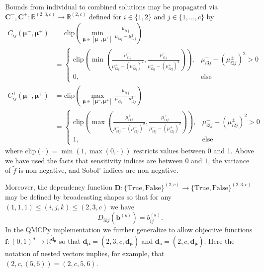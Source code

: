 \documentclass[graybox]{svmult}
\begin{document}
Bounds from individual to combined solutions may be propagated via $\boldsymbol{C}^-,\boldsymbol{C}^+:\mathbb{R}^{(2, 3, c)} \to \mathbb{R}^{(2, c)}$ defined for $i \in \{1,2\}$ and $j \in \{1,\dots,c\}$  by  
\begin{align*}
    C_{ij}^-(\boldsymbol{\mu}^-,\boldsymbol{\mu}^+) 
    &= \text{clip}\left(\min_{\boldsymbol{\mu} \in [\boldsymbol{\mu}^-,\boldsymbol{\mu}^+]} \frac{\mu_{i1j}}{\mu_{i3j}-\mu_{i2j}^2}\right) \\
    &= \begin{cases} 
        \text{clip}\left(\min\left(\frac{\mu_{i1j}^-}{\mu_{i3j}^+-\left(\mu_{i2j}^-\right)^2},\frac{\mu_{i1j}^-}{\mu_{i3j}^+-\left(\mu_{i2j}^+\right)^2}\right)\right), & \mu_{i3j}^- - \left(\mu_{i2j}^\pm\right)^2 >0 \\
        0, &\text{else}
    \end{cases} \\
    C_{ij}^+(\boldsymbol{\mu}^-,\boldsymbol{\mu}^+) 
    &= \text{clip}\left(\max_{\boldsymbol{\mu} \in [\boldsymbol{\mu}^-,\boldsymbol{\mu}^+]} \frac{\mu_{i1j}}{\mu_{i3j}-\mu_{i2j}^2}\right) \\
    &= \begin{cases} 
        \text{clip}\left(\max\left(\frac{\mu_{i1j}^+}{\mu_{i3j}^--\left(\mu_{i2j}^-\right)^2},\frac{\mu_{i1j}^+}{\mu_{i3j}^--\left(\mu_{i2j}^+\right)^2}\right)\right), & \mu_{i3j}^- - \left(\mu_{i2j}^\pm\right)^2 >0 \\
        1, &\text{else}
    \end{cases}
\end{align*}
where $\text{clip}(\cdot) = \min(1,\max(0,\cdot))$ restricts values between 0 and 1. Above we have used the facts that sensitivity indices are between $0$ and $1$, the variance of $\tilde{f}$ is non-negative, and Sobol' indices are non-negative. 

Moreover, the dependency function $\boldsymbol{D}:\{\text{True},\text{False}\}^{(2, c)} \to \{\text{True},\text{False}\}^{(2, 3, c)}$ may be defined by broadcasting shapes so that for any $(1,1,1) \leq (i,j,k) \leq (2,3,c)$ we have  $$D_{ikj}\left(\boldsymbol{b}^{(\boldsymbol{s})}\right) = b_{ij}^{(\boldsymbol{s})}.$$
In the QMCPy implementation we further generalize to allow objective functions $\tilde{\boldsymbol{f}}: (0,1)^{d} \to \mathbb{R}^{\tilde{\boldsymbol{d}}_{\boldsymbol{\mu}}}$ so that $\boldsymbol{d}_{\boldsymbol{\mu}} = (2,3,c,\tilde{\boldsymbol{d}}_{\boldsymbol{\mu}})$ and $\boldsymbol{d}_{\boldsymbol{s}} = (2,c,\tilde{\boldsymbol{d}}_{\boldsymbol{\mu}})$. Here the notation of nested vectors implies, for example, that  $(2,c,(5,6)) =(2,c,5,6)$.
\end{document}
